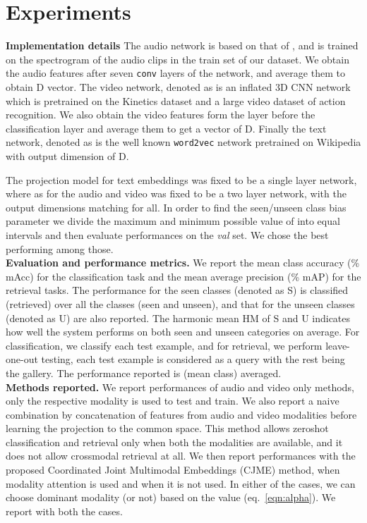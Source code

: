 \section{Experiments}
\label{sec:experiments}
\noindent
\textbf{Implementation details}
The audio network  is based on that of \cite{kumar2018knowledge}, and is trained on the spectrogram of the audio clips in the train set of our dataset. We obtain the audio features after seven \texttt{conv} layers of the network, and average them to obtain D vector. The video network, denoted as  is an inflated 3D CNN network which is pretrained on the Kinetics dataset \cite{CarreiraCVPR2017} and a large video dataset of action recognition. We also obtain the  video features form the layer before the classification layer and average them to get a vector of D. Finally the text network, denoted as  is the well known \texttt{word2vec} network pretrained on Wikipedia \cite{mikolov2018advances} with output dimension of D.

The projection model for text embeddings was fixed to be a single layer network, where as for the audio and video was fixed to be a two layer network, with the output dimensions matching for all. In order to find the seen/unseen class bias parameter  we divide the maximum and minimum possible value of  into  equal intervals and then evaluate performances on the \textit{val} set. We chose the best performing  among those. 
\vspace{0.5em}\\
\textbf{Evaluation and performance metrics.}
We report the mean class accuracy (\% mAcc) for the classification task and the mean average precision (\% mAP) for the retrieval tasks. The performance for the seen classes (denoted as S) is classified (retrieved) over all the classes (seen and unseen), and that for the unseen classes (denoted as U) are also reported. The harmonic mean HM of S and U indicates how well the system performs on both seen and unseen categories on average. For classification, we classify each test example, and for retrieval, we perform leave-one-out testing, \ie each test example is considered as a query with the rest being the gallery. The performance reported is (mean class) averaged. 
\vspace{0.5em}\\
\textbf{Methods reported.}
We report performances of audio and video only methods, \ie only the respective modality is used to test and train. We also report a naive combination by concatenation of features from audio and video modalities before learning the projection to the common space. This method allows zeroshot classification and retrieval only when both the modalities are available, and it does not allow crossmodal retrieval at all. We then report performances with the proposed Coordinated Joint Multimodal Embeddings (CJME) method, when modality attention is used and when it is not used. In either of the cases, we can choose dominant modality (or not) based on the  value (eq.~\ref{eqn:alpha}). We report with both the cases.

